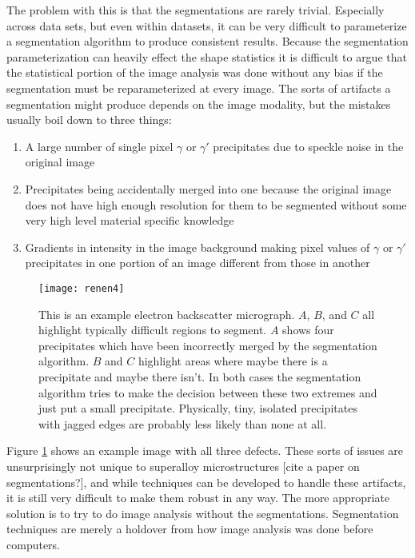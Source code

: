 \documentclass[review]{elsarticle}
\begin{document}
	The problem with this is that the segmentations are rarely trivial. Especially across data sets, but even within datasets, it can be very difficult to parameterize a segmentation algorithm to produce consistent results. Because the segmentation parameterization can heavily effect the shape statistics it is difficult to argue that the statistical portion of the image analysis was done without any bias if the segmentation must be reparameterized at every image. The sorts of artifacts a segmentation might produce depends on the image modality, but the mistakes usually boil down to three things:

	\begin{enumerate}
		\item \label{prob1} A large number of single pixel $\gamma$ or $\gamma'$ precipitates due to speckle noise in the original image
		\item Precipitates being accidentally merged into one because the original image does not have high enough resolution for them to be segmented without some very high level material specific knowledge
		\item Gradients in intensity in the image background making pixel values of $\gamma$ or $\gamma'$ precipitates in one portion of an image different from those in another
	\end{enumerate}
	
	\begin{figure}[!ht]
  		\centering
    	\texttt{[image: renen4]}
  		\caption{This is an example electron backscatter micrograph. $A$, $B$, and $C$ all highlight typically difficult regions to segment. $A$ shows four precipitates which have been incorrectly merged by the segmentation algorithm. $B$ and $C$ highlight areas where maybe there is a precipitate and maybe there isn't. In both cases the segmentation algorithm tries to make the decision between these two extremes and just put a small precipitate. Physically, tiny, isolated precipitates with jagged edges are probably less likely than none at all. }
  		\label{figure1}
	\end{figure}

	Figure \ref{figure1} shows an example image with all three defects. These sorts of issues are unsurprisingly not unique to superalloy microstructures [cite a paper on segmentations?], and while techniques can be developed to handle these artifacts, it is still very difficult to make them robust in any way. The more appropriate solution is to try to do image analysis without the segmentations. Segmentation techniques are merely a holdover from how image analysis was done before computers.
\end{document}
